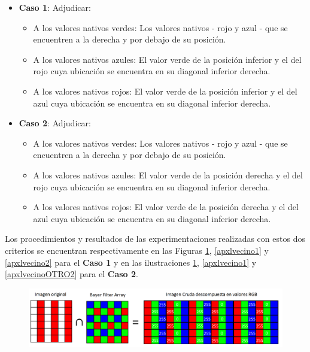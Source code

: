 \documentclass[a4paper]{article}
\begin{document}
\begin{itemize}
\item \textbf{Caso 1}: 
    Adjudicar:
\begin{itemize}
\item   A los valores nativos verdes: Los valores nativos - rojo y azul - que se encuentren a la derecha y por debajo de su posición.
\item   A los valores nativos azules: El valor verde de la posición inferior y el del rojo  cuya ubicación se encuentra en su diagonal inferior derecha.
\item   A los valores nativos rojos: El valor verde de la posición inferior y el del azul cuya ubicación se encuentra en su diagonal inferior derecha.  
\end{itemize}

\item \textbf{Caso 2}: 
    Adjudicar:
\begin{itemize}
\item   A los valores nativos verdes: Los valores nativos - rojo y azul - que se encuentren a la derecha y por debajo de su posición.
\item   A los valores nativos azules: El valor verde de la posición derecha y el del rojo cuya ubicación se encuentra en su diagonal inferior derecha.
\item   A los valores nativos rojos: El valor verde de la posición derecha y el del azul  cuya ubicación se encuentra en su diagonal inferior derecha.
\end{itemize}

    
\end{itemize}

Los procedimientos y resultados de las experimentaciones realizadas con estos dos criterios se encuentran respectivamente en las Figuras \ref{apxlvecino0}, \ref{apxlvecino1} y \ref{apxlvecino2} para el \textbf{Caso 1} y en las ilustraciones \ref{apxlvecino0}, \ref{apxlvecino1} y \ref{apxlvecinoOTRO2} para el \textbf{Caso 2}.

\newpage

\begin{figure}[h!]
    \caption{}
    \begin{center}
    \includegraphics[scale=0.30]{imagenes/apxlvecino0}
    \label{apxlvecino0}
  \end{center}
\end{figure}
\end{document}
